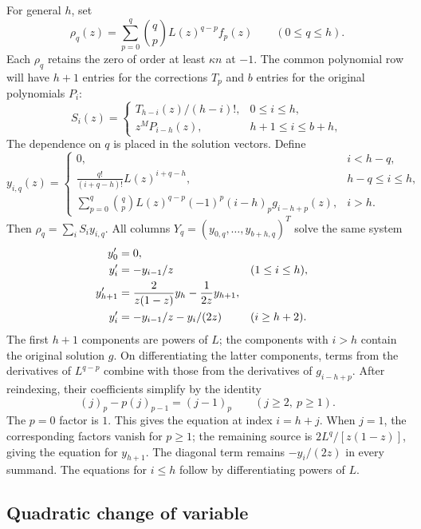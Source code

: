 For general $h$, set
\[
 \rho_q(z)=\sum_{p=0}^q\binom qp L(z)^{q-p}f_p(z)
 \qquad(0\leq q\leq h).
\]
Each $\rho_q$ retains the zero of order at least $\kappa n$ at $-1$.
The common polynomial row will have $h+1$ entries for the corrections
$T_p$ and $b$ entries for the original polynomials $P_i$:
\begin{equation}\label{eq:S-common}
 S_i(z)=
 \begin{cases}
 T_{h-i}(z)/(h-i)!,&0\leq i\leq h,\\
 z^M P_{i-h}(z),&h+1\leq i\leq b+h,
 \end{cases}
\end{equation}
The dependence on $q$ is placed in the solution vectors. Define
\begin{equation}\label{eq:Yq}
 y_{i,q}(z)=
 \begin{cases}
 0,&i<h-q,\\[2pt]
 \displaystyle\frac{q!}{(i+q-h)!}L(z)^{i+q-h},&h-q\leq i\leq h,\\[6pt]
 \displaystyle\sum_{p=0}^q\binom qp L(z)^{q-p}
            (-1)^p(i-h)_p g_{i-h+p}(z),&i>h.
 \end{cases}
\end{equation}
Then $\rho_q=\sum_i S_i y_{i,q}$.
All columns $Y_q=(y_{0,q},\ldots,y_{b+h,q})^T$ solve the same system
\begin{align}
 y_0'&=0,\notag\\
 y_i'&=-y_{i-1}/z &&(1\leq i\leq h),\notag\\
 y_{h+1}'&=\frac{2}{z(1-z)}y_h-\frac1{2z}y_{h+1},
                                                   \label{eq:enlarged-system}\\
 y_i'&=-y_{i-1}/z-y_i/(2z) &&(i\geq h+2).\notag
\end{align}
The first $h+1$ components are powers of $L$; the components with $i>h$
contain the original solution $g$.
On differentiating the latter components, terms from the derivatives of
$L^{q-p}$ combine with those from the derivatives of $g_{i-h+p}$.
After reindexing, their coefficients simplify by the identity
\[
 (j)_p-p(j)_{p-1}=(j-1)_p
 \qquad(j\geq2,\ p\geq1).
\]
The $p=0$ factor is $1$. This gives the equation at index $i=h+j$.
When $j=1$, the corresponding factors vanish for $p\geq1$; the remaining
source is $2L^q/[z(1-z)]$, giving the equation for $y_{h+1}$.
The diagonal term remains $-y_i/(2z)$ in every summand.
The equations for $i\leq h$ follow by differentiating powers of $L$.

\subsection{Quadratic change of variable}

